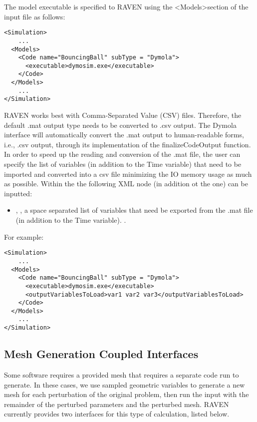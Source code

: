 The model executable is specified to RAVEN using the \textless Models\textgreater  section of the input file as follows:
\begin{lstlisting}[style=XML]
<Simulation>
    ...
  <Models>
    <Code name="BouncingBall" subType = "Dymola">
      <executable>dymosim.exe</executable>
    </Code>
  </Models>
    ...
</Simulation>
\end{lstlisting}
RAVEN works best with Comma-Separated Value (CSV) files.  Therefore, the default 
.mat output type needs to be converted to .csv output.
The Dymola interface will automatically convert the .mat output to human-readable 
forms, i.e., .csv output, through its implementation of the finalizeCodeOutput function.
\\In order to speed up the reading and conversion of the .mat file, the user can specify
the list of variables (in addition to the Time variable) that need to be imported and 
converted into a csv file minimizing 
the IO memory usage as much as possible. Within the  the following 
XML 
node (in addition ot the  one) can be inputted:

\begin{itemize}
   \item {}, , a space separated list of variables that need be exported from the .mat 
   file (in addition to the Time variable). .
\end{itemize}
For example:
\begin{lstlisting}[style=XML]
<Simulation>
    ...
  <Models>
    <Code name="BouncingBall" subType = "Dymola">
      <executable>dymosim.exe</executable>
      <outputVariablesToLoad>var1 var2 var3</outputVariablesToLoad>
    </Code>
  </Models>
    ...
</Simulation>
\end{lstlisting}


\subsection{Mesh Generation Coupled Interfaces}
Some software requires a provided mesh that requires a separate code run to generate.
In these cases, we use sampled geometric
variables to generate a new mesh for each perturbation of the original problem, then run the input with
the remainder of the perturbed parameters and the perturbed mesh.  RAVEN currently provides two interfaces for
this type of calculation, listed below.

